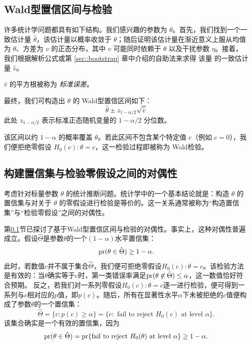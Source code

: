 \subsection{Wald型置信区间与检验}\label{section::wald-type-ci-test}


许多统计学问题都具有如下结构。我们感兴趣的参数为 $\theta$。首先，我们找到一个一致估计量 $\hat\theta$，该估计量以概率收敛于 $\theta$；随后证明该估计量在渐近意义上服从均值为 $\theta$、方差为 $v$ 的正态分布，其中 $v$ 可能同时依赖于 $\theta$ 以及干扰参数 $\eta$。接着，我们根据解析公式或第 \ref{sec::bootstrap} 章中介绍的自助法来求得 该量 的一致估计量 $\hat v$。

$\hat v$ 的平方根被称为 {\it 标准误差}。

最终，我们可构造出 $\theta$ 的 Wald型置信区间如下：
$$
\hat{\theta} \pm z_{1-\alpha/2} \sqrt{ \hat{v} }
$$
此处 $z_{1-\alpha/2}$ 表示标准正态随机变量的 $1-\alpha/2$ 分位数。

该区间以约 $1-\alpha$ 的概率覆盖 $\theta$。若此区间不包含某个特定值 $c$（例如 $c = 0$），我们便拒绝零假设 $H_0(c): \theta = c$，这一检验过程即被称为 Wald检验。 

 
 
 \subsection{构建置信集与检验零假设之间的对偶性}
 \label{section::duality-ci-testing}

考虑针对标量参数 $\theta$ 的统计推断问题。统计学中的一个基本结论就是：构造 $\theta$ 的置信集与对关于 $\theta$ 的零假设进行检验是等价的。这一关系通常被称为“构造置信集”与“检验零假设”之间的对偶性。 

第\ref{section::wald-type-ci-test}节已探讨了基于Wald型置信区间与检验的对偶性。事实上，这种对偶性普遍成立。假设$\hat\Theta$是参数$\theta$的一个$(1-\alpha)$水平置信集：
$$
\textup{pr}(  \theta \in \hat\Theta  ) \geq  1-\alpha.
$$
此时，若数值$c$并不属于集合$\hat\Theta$，我们便可拒绝零假设$H_0(c): \theta = c$。该检验方法是有效的：当$\theta$确实等于$c$时，第一类错误率满足$\textup{pr}(  \theta \not  \in \hat\Theta ) \leq  \alpha$，这一数值恰好符合预期。
反之，若我们对一系列零假设$H_0(c): \theta = c$逐一进行检验，便可得到一系列与$c$相对应的$p$值，即$p(c)$。随后，所有在显著性水平$\alpha$下未被拒绝的$c$值便构成了参数$\theta$的一个置信集：
$$
 \hat\Theta = 
\{  c:  p(c) \geq \alpha \} = \{  c: \text{ fail to reject } H_0(c) \text{ at level } \alpha \} . 
$$
该集合确实是一个有效的置信集，因为
$$
\textup{pr}( \theta \in  \hat\Theta ) = 
\textup{pr}\{  \text{fail to reject } H_0(\theta) \text{ at level } \alpha \} \geq   1-\alpha.
$$


